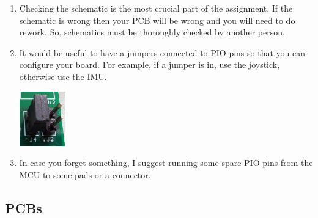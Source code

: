 \documentclass[11pt, a4paper]{article}
\begin{document}
\begin{enumerate}
\item Checking the schematic is the most crucial part of the
  assignment.  If the schematic is wrong then your PCB will be wrong
  and you will need to do rework.  So, schematics must be thoroughly
  checked by another person.




\item It would be useful to have a jumpers connected to PIO pins so
  that you can configure your board.  For example, if a jumper is in,
  use the joystick, otherwise use the IMU.

\includegraphics[width=2cm]{../guide/figs/jumpers.jpg}

\item In case you forget something, I suggest running some spare PIO
  pins from the MCU to some pads or a connector.

\end{enumerate}


\subsection{PCBs}
\end{document}
